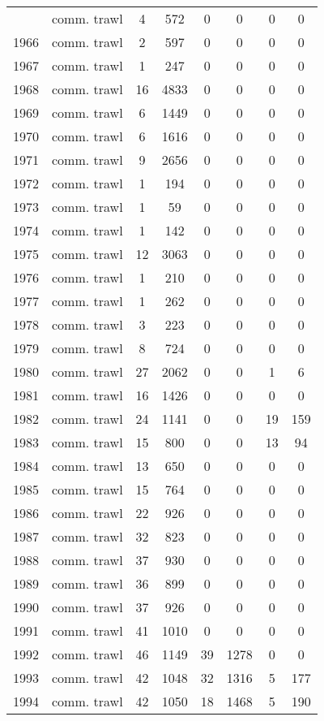 \begin{longtable}[t]{c>{\centering\arraybackslash}p{3cm}cccccc}
\endfoot
\bottomrule
\endlastfoot
1965 & comm. trawl & 4 & 572 & 0 & 0 & 0 & 0\\
1966 & comm. trawl & 2 & 597 & 0 & 0 & 0 & 0\\
1967 & comm. trawl & 1 & 247 & 0 & 0 & 0 & 0\\
1968 & comm. trawl & 16 & 4833 & 0 & 0 & 0 & 0\\
1969 & comm. trawl & 6 & 1449 & 0 & 0 & 0 & 0\\
1970 & comm. trawl & 6 & 1616 & 0 & 0 & 0 & 0\\
1971 & comm. trawl & 9 & 2656 & 0 & 0 & 0 & 0\\
1972 & comm. trawl & 1 & 194 & 0 & 0 & 0 & 0\\
1973 & comm. trawl & 1 & 59 & 0 & 0 & 0 & 0\\
1974 & comm. trawl & 1 & 142 & 0 & 0 & 0 & 0\\
1975 & comm. trawl & 12 & 3063 & 0 & 0 & 0 & 0\\
1976 & comm. trawl & 1 & 210 & 0 & 0 & 0 & 0\\
1977 & comm. trawl & 1 & 262 & 0 & 0 & 0 & 0\\
1978 & comm. trawl & 3 & 223 & 0 & 0 & 0 & 0\\
1979 & comm. trawl & 8 & 724 & 0 & 0 & 0 & 0\\
1980 & comm. trawl & 27 & 2062 & 0 & 0 & 1 & 6\\
1981 & comm. trawl & 16 & 1426 & 0 & 0 & 0 & 0\\
1982 & comm. trawl & 24 & 1141 & 0 & 0 & 19 & 159\\
1983 & comm. trawl & 15 & 800 & 0 & 0 & 13 & 94\\
1984 & comm. trawl & 13 & 650 & 0 & 0 & 0 & 0\\
1985 & comm. trawl & 15 & 764 & 0 & 0 & 0 & 0\\
1986 & comm. trawl & 22 & 926 & 0 & 0 & 0 & 0\\
1987 & comm. trawl & 32 & 823 & 0 & 0 & 0 & 0\\
1988 & comm. trawl & 37 & 930 & 0 & 0 & 0 & 0\\
1989 & comm. trawl & 36 & 899 & 0 & 0 & 0 & 0\\
1990 & comm. trawl & 37 & 926 & 0 & 0 & 0 & 0\\
1991 & comm. trawl & 41 & 1010 & 0 & 0 & 0 & 0\\
1992 & comm. trawl & 46 & 1149 & 39 & 1278 & 0 & 0\\
1993 & comm. trawl & 42 & 1048 & 32 & 1316 & 5 & 177\\
1994 & comm. trawl & 42 & 1050 & 18 & 1468 & 5 & 190\\

\end{longtable}
